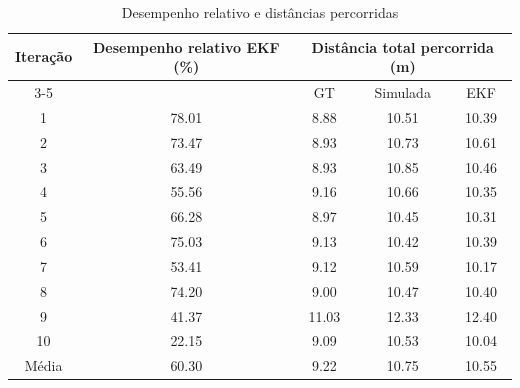 \begin{table}[H]
\centering
\caption{Desempenho relativo e distâncias percorridas}
\label{tab:desempenho}
\begin{tabular}{ccccc}
\toprule
Iteração & Desempenho relativo EKF (\%) & \multicolumn{3}{c}{Distância total percorrida (m)} \\
\cmidrule(lr){3-5}
 & & GT & Simulada & EKF \\
\midrule
1 & 78.01 & 8.88 & 10.51 & 10.39 \\
2 & 73.47 & 8.93 & 10.73 & 10.61 \\
3 & 63.49 & 8.93 & 10.85 & 10.46 \\
4 & 55.56 & 9.16 & 10.66 & 10.35 \\
5 & 66.28 & 8.97 & 10.45 & 10.31 \\
6 & 75.03 & 9.13 & 10.42 & 10.39 \\
7 & 53.41 & 9.12 & 10.59 & 10.17 \\
8 & 74.20 & 9.00 & 10.47 & 10.40 \\
9 & 41.37 & 11.03 & 12.33 & 12.40 \\
10 & 22.15 & 9.09 & 10.53 & 10.04 \\
\midrule
Média & 60.30 & 9.22 & 10.75 & 10.55 \\
\bottomrule
\end{tabular}
\end{table}
